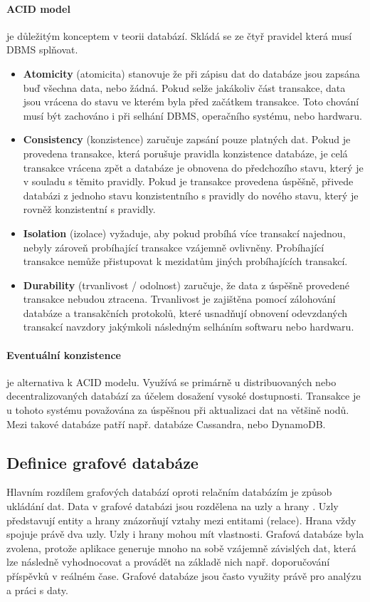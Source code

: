 \documentclass[12pt, a4paper,
 twoside,        %
 openright
]{report}
\begin{document}
\paragraph{ACID model} je důležitým konceptem v teorii databází. Skládá se ze čtyř pravidel která musí DBMS splňovat.
\begin{itemize}
    

\item \textbf{Atomicity} (atomicita) stanovuje že při zápisu dat do databáze jsou zapsána buď všechna data, nebo žádná. Pokud selže jakákoliv část transakce, data jsou vrácena do stavu ve kterém byla před začátkem transakce. Toto chování musí být zachováno i při selhání DBMS, operačního systému, nebo hardwaru.
\item \textbf{Consistency} (konzistence) zaručuje zapsání pouze platných dat. Pokud je provedena transakce, která porušuje pravidla konzistence databáze, je celá transakce vrácena zpět a databáze je obnovena do předchozího stavu, který je v souladu s těmito pravidly. Pokud je transakce provedena úspěšně, přivede databázi z jednoho stavu konzistentního s pravidly do nového stavu, který je rovněž konzistentní s pravidly.
\item \textbf{Isolation} (izolace) vyžaduje, aby pokud probíhá více transakcí najednou, nebyly zároveň probíhající transakce vzájemně ovlivněny. Probíhající transakce nemůže přistupovat k mezidatům jiných probíhajících transakcí.
\item \textbf{Durability} (trvanlivost / odolnost) zaručuje, že data z úspěšně provedené transakce nebudou ztracena. Trvanlivost je zajištěna pomocí zálohování databáze a transakčních protokolů, které usnadňují obnovení odevzdaných transakcí navzdory jakýmkoli následným selháním softwaru nebo hardwaru. \cite{whatIsACID}
\end{itemize}
\paragraph{Eventuální konzistence} je alternativa k ACID modelu. Využívá se primárně u distribuovaných nebo decentralizovaných databází za účelem dosažení vysoké dostupnosti. Transakce je u tohoto systému považována za úspěšnou při aktualizaci dat na většině nodů. Mezi takové databáze patří např. databáze Cassandra, nebo DynamoDB.

\subsection{Definice grafové databáze}
Hlavním rozdílem grafových databází oproti relačním databázím je způsob ukládání dat.
Data v grafové databázi jsou rozdělena na uzly a hrany \cite{graphenTheorie}. Uzly představují entity a hrany znázorňují vztahy mezi entitami (relace). Hrana vždy spojuje právě dva uzly.
Uzly i hrany mohou mít vlastnosti. Grafová databáze byla zvolena, protože aplikace generuje mnoho na sobě vzájemně závislých dat, která
lze následně vyhodnocovat a provádět na základě nich např. doporučování příspěvků v reálném čase. Grafové databáze jsou často využity právě pro analýzu a práci s daty. \cite{graphDatabasesIntroduction}\cite{graphAlgorithms}
\end{document}
